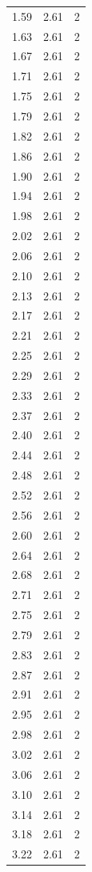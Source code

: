 \begin{longtable}{lrr}
  1.59 & 2.61 & 2 \\
  1.63 & 2.61 & 2 \\
  1.67 & 2.61 & 2 \\
  1.71 & 2.61 & 2 \\
  1.75 & 2.61 & 2 \\
  1.79 & 2.61 & 2 \\
  1.82 & 2.61 & 2 \\
  1.86 & 2.61 & 2 \\
  1.90 & 2.61 & 2 \\
  1.94 & 2.61 & 2 \\
  1.98 & 2.61 & 2 \\
  2.02 & 2.61 & 2 \\
  2.06 & 2.61 & 2 \\
  2.10 & 2.61 & 2 \\
  2.13 & 2.61 & 2 \\
  2.17 & 2.61 & 2 \\
  2.21 & 2.61 & 2 \\
  2.25 & 2.61 & 2 \\
  2.29 & 2.61 & 2 \\
  2.33 & 2.61 & 2 \\
  2.37 & 2.61 & 2 \\
  2.40 & 2.61 & 2 \\
  2.44 & 2.61 & 2 \\
  2.48 & 2.61 & 2 \\
  2.52 & 2.61 & 2 \\
  2.56 & 2.61 & 2 \\
  2.60 & 2.61 & 2 \\
  2.64 & 2.61 & 2 \\
  2.68 & 2.61 & 2 \\
  2.71 & 2.61 & 2 \\
  2.75 & 2.61 & 2 \\
  2.79 & 2.61 & 2 \\
  2.83 & 2.61 & 2 \\
  2.87 & 2.61 & 2 \\
  2.91 & 2.61 & 2 \\
  2.95 & 2.61 & 2 \\
  2.98 & 2.61 & 2 \\
  3.02 & 2.61 & 2 \\
  3.06 & 2.61 & 2 \\
  3.10 & 2.61 & 2 \\
  3.14 & 2.61 & 2 \\
  3.18 & 2.61 & 2 \\
  3.22 & 2.61 & 2 \\

\end{longtable}
